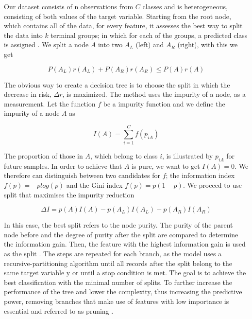 \documentclass[12pt]{article}
\begin{document}
Our dataset consists of n observations from $C$ classes and is heterogeneous, consisting of both values of the target variable. Starting from the root node, which contains all of the data, for every feature, it assesses the best way to split the data into $k$ terminal groups; in which for each of the groups, a predicted class is assigned \cite{therneau1997introduction}. We split a node $A$ into two \(A_{L}\) (left) and \(A_{R}\) (right), with this we get

\begin{center}
	\begin{equation}
P(A_{L}) r(A_{L}) + P(A_{R}) r(A_{R}) \leq P(A)r(A)
	\end{equation}
\end{center}


The obvious way to create a decision tree is to choose the split in which the decrease in risk, $\Delta r$, is maximized. The method uses the impurity of a node, as a measurement. Let the function $f$ be a impurity function and we define the impurity of a node $A$ as

\begin{center}
	\begin{equation}
I(A) = \sum_{i=1}^C
f(p_{iA})
	\end{equation}
\end{center}

The proportion of those in $A$, which belong to class $i$, is illustrated by $p_{iA}$ for future samples. In order to achieve that $A$ is pure, we want to get $I(A) =0$. We therefore can distinguish between two candidates for $f$; the information index \(f(p) = -plog(p)\) and the Gini index \(f(p) = p(1-p)\). We proceed to use split that maximises the impurity reduction 

\begin{center}
	\begin{equation}
	\Delta I = p(A)I(A) − p(A_L)I(A_L) − p(A_R)I(A_R)
	\end{equation}
\end{center}

In this case, the best split refers to the node purity. The purity of the parent node before and the degree of purity after the split are compared to determine the information gain. Then, the feature with the highest information gain is used as the split \cite{abbott2014applied}. The steps are repeated for each branch, as the model uses a recursive-partitioning algorithm until all records after the split belong to the same target variable y or until a stop condition is met. The goal is to achieve the best classification with the minimal number of splits. To further increase the performance of the tree and lower the complexity, thus increasing the predictive power, removing branches that make use of features with low importance is essential and referred to as pruning \cite{safavian1991survey}.
\end{document}
